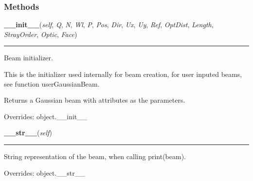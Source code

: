 
  \subsubsection{Methods}

    \vspace{0.5ex}

\hspace{.8\funcindent}\begin{boxedminipage}{\funcwidth}

    \raggedright \textbf{\_\_init\_\_}(\textit{self}, \textit{Q}, \textit{N}, \textit{Wl}, \textit{P}, \textit{Pos}, \textit{Dir}, \textit{Ux}, \textit{Uy}, \textit{Ref}, \textit{OptDist}, \textit{Length}, \textit{StrayOrder}, \textit{Optic}, \textit{Face})

    \vspace{-1.5ex}

    \rule{\textwidth}{0.5\fboxrule}
\setlength{\parskip}{2ex}
    Beam initializer.

    This is the initializer used internally for beam creation, for user 
    inputed beams, see function userGaussianBeam.

    Returns a Gaussian beam with attributes as the parameters.

\setlength{\parskip}{1ex}
      Overrides: object.\_\_init\_\_

    \end{boxedminipage}

    \vspace{0.5ex}

\hspace{.8\funcindent}\begin{boxedminipage}{\funcwidth}

    \raggedright \textbf{\_\_str\_\_}(\textit{self})

    \vspace{-1.5ex}

    \rule{\textwidth}{0.5\fboxrule}
\setlength{\parskip}{2ex}
    String representation of the beam, when calling print(beam).

\setlength{\parskip}{1ex}
      Overrides: object.\_\_str\_\_

    \end{boxedminipage}

